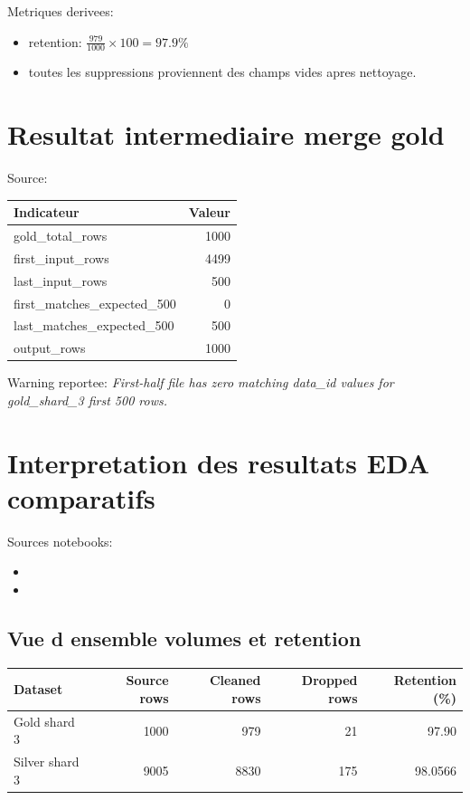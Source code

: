 \documentclass[11pt,a4paper]{article}
\begin{document}
\noindent Metriques derivees:
\begin{itemize}[leftmargin=*]
  \item retention: $\frac{979}{1000}\times 100 = 97.9\%$
  \item toutes les suppressions proviennent des champs vides apres nettoyage.
\end{itemize}

\section{Resultat intermediaire merge gold}
Source: 

\begin{center}
\begin{tabular}{lr}
\toprule
Indicateur & Valeur \\
\midrule
gold\_total\_rows & 1000 \\
first\_input\_rows & 4499 \\
last\_input\_rows & 500 \\
first\_matches\_expected\_500 & 0 \\
last\_matches\_expected\_500 & 500 \\
output\_rows & 1000 \\
\bottomrule
\end{tabular}
\end{center}

\noindent Warning reportee: \textit{First-half file has zero matching data\_id values for gold\_shard\_3 first 500 rows.}

\section{Interpretation des resultats EDA comparatifs}
Sources notebooks:
\begin{itemize}[leftmargin=*]
  \item {}
  \item {}
\end{itemize}

\subsection{Vue d ensemble volumes et retention}
\begin{center}
\begin{tabular}{lrrrr}
\toprule
Dataset & Source rows & Cleaned rows & Dropped rows & Retention (\%) \\
\midrule
Gold shard 3 & 1000 & 979 & 21 & 97.90 \\
Silver shard 3 & 9005 & 8830 & 175 & 98.0566 \\
\bottomrule
\end{tabular}
\end{center}
\end{document}
